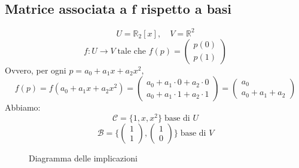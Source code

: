 \documentclass[a4paper]{article}
\theoremstyle{break}
\theoremstyle{break}
\theoremstyle{break}
\theoremstyle{break}
\begin{document}
\subsection{Matrice associata a f rispetto a basi}
\begin{example}
  \[
    U = \mathbb{R}_2[x], \quad V = \mathbb{R}^2
  \] 
  \[
  f: U \to V \; \text{tale che } f(p) = \begin{pmatrix} p(0)\\p(1) \end{pmatrix}
  \] 
  Ovvero, per ogni \( p = a_0 + a_1x + a_2 x^2 \),
  \[
    f(p) = f(a_0 + a_1 x + a_2 x^2) = \begin{pmatrix} 
      a_0 + a_1 \cdot 0 + a_2 \cdot 0\\
      a_0 + a_1 \cdot 1 + a_2 \cdot 1
    \end{pmatrix} 
    =
    \begin{pmatrix} 
      a_0\\
      a_0 + a_1 + a_2
    \end{pmatrix} 
  \] 
  Abbiamo:
  \[
  \mathcal{C} = \{1,x,x^2\} \; \text{base di } U
  \] 
  \[
  \mathcal{B} = \{
    \begin{pmatrix} 1\\1 \end{pmatrix} ,
    \begin{pmatrix} 1\\0 \end{pmatrix} 
  \} \; \text{base di } V
  \] 
\begin{figure}[H]
  \centering
  \caption{Diagramma delle implicazioni}
\end{figure}


\end{example}
\end{document}
